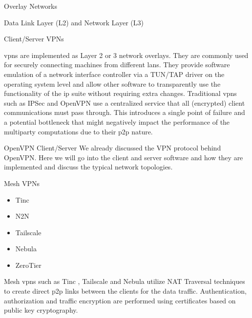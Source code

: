 \begin{block}{Overlay Networks}
\begin{block}{Data Link Layer (L2) and Network Layer (L3)}
\begin{block}{Client/Server VPNs}
\begin{itemize}
\begin{itemize}
    \glspl{vpn} are implemented as Layer 2 or 3 network overlays. They are commonly used for securely connecting machines from different \glspl{lan}. They provide software emulation of a network interface controller via a TUN/TAP driver on the operating system level and allow other software to transparently use the functionality of the \gls{ip} suite without requiring extra changes. Traditional \glspl{vpn} such as IPSec \autocite{ipSecRFC} and OpenVPN \autocite{openVPNDocs} use a centralized service that all (encrypted) client communications must pass through. This introduces a single point of failure and a potential bottleneck that might negatively impact the performance of the multiparty computations due to their \gls{p2p} nature.
  \end{itemize}
\end{itemize}

\begin{block}{OpenVPN Client/Server}
\label{thesis__022-overlays.md__openvpn-clientserver}
We already discussed the VPN protocol behind OpenVPN. Here we will go into the client and server software and how they are implemented and discuss the typical network topologies.
\end{block}
\end{block}

\begin{block}{Mesh VPNs}
\label{thesis__022-overlays.md__mesh-vpns}
\begin{itemize}
\tightlist
\item
  Tinc
\item
  N2N
\item
  Tailscale
\item
  Nebula
\item
  ZeroTier
\end{itemize}

Mesh \glspl{vpn} such as Tinc \autocite{tincDocs}, Tailscale \autocite{tailscaleDocs} and Nebula \autocite{nebulaDocs} utilize NAT Traversal techniques to create direct \gls{p2p} links between the clients for the data traffic. Authentication, authorization and traffic encryption are performed using certificates based on public key cryptography.


\end{block}
\end{block}
\end{block}
